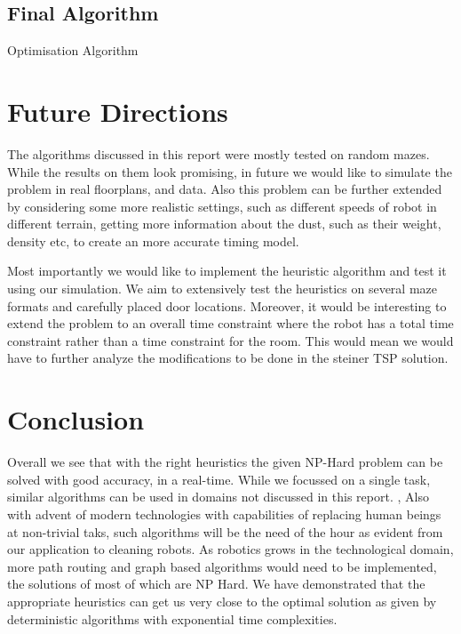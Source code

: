 \documentclass{article}
\begin{document}
\subsection{Final Algorithm}

\begin{algorithm}[H]
    \SetAlgoLined
    \caption{Optimisation Algorithm}
\end{algorithm}



\section{Future Directions}

The algorithms discussed in this report were mostly tested on random mazes. While the results on them look promising, in future we would like to simulate the problem in real floorplans, and data.
Also this problem can be further extended by considering some more realistic settings, such as different speeds of robot in different terrain, getting more information about the dust, such as their weight, density etc, to create an more accurate timing model.

Most importantly we would like to implement the heuristic algorithm and test it using our simulation. We aim to extensively test the heuristics on several
maze formats and carefully placed door locations. Moreover, it would be interesting to extend the problem to an overall time constraint where the robot has 
a total time constraint rather than a time constraint for the room. This would mean we would have to further analyze the modifications to be done in the steiner TSP solution.

\section{Conclusion}


Overall we see that with the right heuristics the given NP-Hard problem can be solved with good accuracy, in a real-time. While we focussed on a single task, similar algorithms can be used 
in domains not discussed in this report. \cite{apps1},\cite{apps2} Also with advent of modern technologies with capabilities of replacing human beings at non-trivial taks, such algorithms will be the need of the hour as evident from our application to cleaning robots.
As robotics grows in the technological domain, more path routing and graph based algorithms would need to be implemented, the solutions of most of which are NP Hard. We have demonstrated that 
the appropriate heuristics can get us very close to the optimal solution as given by deterministic algorithms with exponential time complexities.





\end{document}
